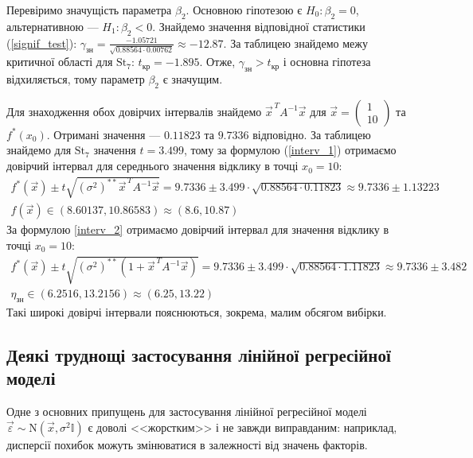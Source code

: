 Перевіримо значущість параметра $\beta_2$. Основною гіпотезою є $H_0 : \beta_2 = 0$,
альтернативною --- $H_1 : \beta_2 < 0$. Знайдемо значення відповідної статистики
(\ref{signif_test}): $\gamma_\text{зн} = \frac{
    -1.05721
}{
    \sqrt{0.88564 \cdot 0.00762}
} \approx - 12.87$. 
За таблицею знайдемо межу критичної області для $\mathrm{St}_7$: $t_\text{кр} = -1.895$.
Отже, $\gamma_\text{зн} > t_\text{кр}$ і основна гіпотеза відхиляється, тому параметр $\beta_2$ є значущим.

Для знаходження обох довірчих інтервалів знайдемо 
$\vec{x}^{\, T} A^{-1} \vec{x}$ для $\vec{x} = \begin{pmatrix}
    1 \\ 10
\end{pmatrix}$ та $f^*(x_0)$. Отримані значення --- $0.11823$ та $9.7336$ відповідно.
За таблицею знайдемо для $\mathrm{St}_7$ значення $t = 3.499$, тому за формулою
(\ref{interv_1}) отримаємо довірчий інтервал для середнього значення відклику в точці $x_0 = 10$:
\begin{gather*}
    f^*(\vec{x}) \pm t \sqrt{(\sigma^2)^{**} \vec{x}^{\, T} A^{-1} \vec{x}} =
    9.7336 \pm 3.499\cdot\sqrt{0.88564 \cdot 0.11823} \approx 9.7336 \pm 1.13223 \\
    f(\vec{x}) \in 
    \left(
        8.60137, 
        10.86583
    \right) \approx \left(8.6, 10.87\right)
\end{gather*}
За формулою \ref{interv_2} отримаємо довірчий інтервал для значення відклику в точці $x_0 = 10$:
\begin{gather*}
    f^*(\vec{x}) \pm t \sqrt{(\sigma^2)^{**}\left(1 + \vec{x}^{\, T} A^{-1} \vec{x}\right)} = 
    9.7336 \pm 3.499\cdot\sqrt{0.88564 \cdot 1.11823} \approx 9.7336 \pm 3.482 \\
    \eta_\text{зн} \in \left(6.2516, 13.2156\right) \approx \left(6.25, 13.22\right)
\end{gather*}
Такі широкі довірчі інтервали пояснюються, зокрема, малим обсягом вибірки.

\subsection{Деякі труднощі застосування лінійної регресійної моделі}
Одне з основних припущень для застосування лінійної регресійної моделі $\vec{\varepsilon} \sim \mathrm{N}(\vec{x}, \sigma^2 \mathbb{I})$ є доволі
<<жорстким>> і не завжди виправданим: наприклад, дисперсії похибок можуть змінюватися в залежності від значень факторів.

